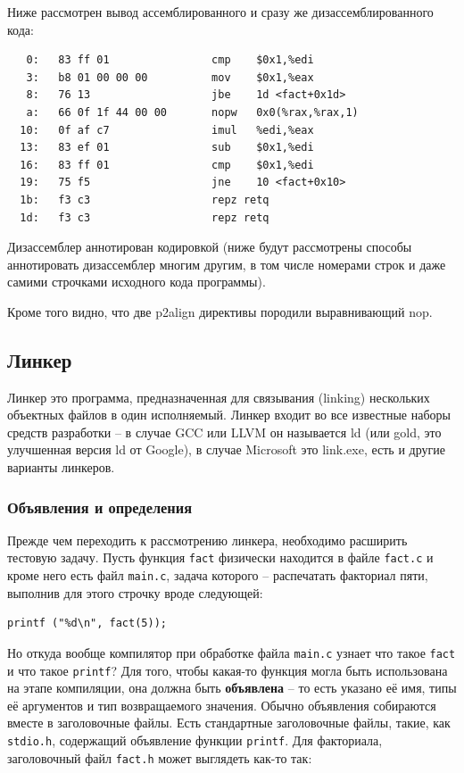 \documentclass[a4paper,12pt,oneside]{article}
\begin{document}
Ниже рассмотрен вывод ассемблированного и сразу же дизассемблированного кода:

\begin{verbatim}
   0:	83 ff 01             	cmp    $0x1,%edi
   3:	b8 01 00 00 00       	mov    $0x1,%eax
   8:	76 13                	jbe    1d <fact+0x1d>
   a:	66 0f 1f 44 00 00    	nopw   0x0(%rax,%rax,1)
  10:	0f af c7             	imul   %edi,%eax
  13:	83 ef 01             	sub    $0x1,%edi
  16:	83 ff 01             	cmp    $0x1,%edi
  19:	75 f5                	jne    10 <fact+0x10>
  1b:	f3 c3                	repz retq 
  1d:	f3 c3                	repz retq 
\end{verbatim}

Дизассемблер аннотирован кодировкой (ниже будут рассмотрены способы аннотировать дизассемблер многим другим, в том числе номерами строк и даже самими строчками исходного кода программы).

Кроме того видно, что две p2align директивы породили выравнивающий nop.

\pagebreak
\subsection{Линкер}

Линкер это программа, предназначенная для связывания (linking) нескольких объектных файлов в один исполняемый. Линкер входит во все известные наборы средств разработки -- в случае GCC или LLVM он называется ld (или gold, это улучшенная версия ld от Google), в случае Microsoft это link.exe, есть и другие варианты линкеров.

\subsubsection{Объявления и определения}

Прежде чем переходить к рассмотрению линкера, необходимо расширить тестовую задачу. Пусть функция \lstinline!fact! физически находится в файле \lstinline!fact.c! и кроме него есть файл \lstinline!main.c!, задача которого -- распечатать факториал пяти, выполнив для этого строчку вроде следующей:

\begin{lstlisting}
printf ("%d\n", fact(5));
\end{lstlisting}

Но откуда вообще компилятор при обработке файла \lstinline!main.c! узнает что такое \lstinline!fact! и что такое \lstinline!printf!? Для того, чтобы какая-то функция могла быть использована на этапе компиляции, она должна быть \textbf{объявлена} -- то есть указано её имя, типы её аргументов и тип возвращаемого значения. Обычно объявления собираются вместе в заголовочные файлы. Есть стандартные заголовочные файлы, такие, как \lstinline!stdio.h!, содержащий объявление функции \lstinline!printf!. Для факториала, заголовочный файл \lstinline!fact.h! может выглядеть как-то так:
\end{document}
